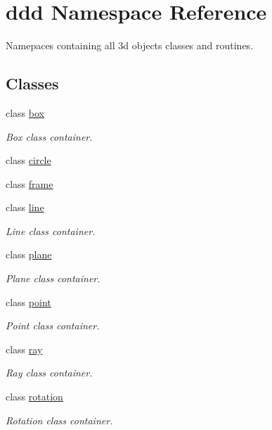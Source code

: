 \hypertarget{namespaceddd}{}\section{ddd Namespace Reference}
\label{namespaceddd}


Namepaces containing all 3d objects classes and routines.  


\subsection*{Classes}
\begin{DoxyCompactItemize}
\item 
class \hyperlink{classddd_1_1box}{box}
\begin{DoxyCompactList}\small\item\em Box class container. \end{DoxyCompactList}\item 
class \hyperlink{classddd_1_1circle}{circle}
\item 
class \hyperlink{classddd_1_1frame}{frame}
\item 
class \hyperlink{classddd_1_1line}{line}
\begin{DoxyCompactList}\small\item\em Line class container. \end{DoxyCompactList}\item 
class \hyperlink{classddd_1_1plane}{plane}
\begin{DoxyCompactList}\small\item\em Plane class container. \end{DoxyCompactList}\item 
class \hyperlink{classddd_1_1point}{point}
\begin{DoxyCompactList}\small\item\em Point class container. \end{DoxyCompactList}\item 
class \hyperlink{classddd_1_1ray}{ray}
\begin{DoxyCompactList}\small\item\em Ray class container. \end{DoxyCompactList}\item 
class \hyperlink{classddd_1_1rotation}{rotation}
\begin{DoxyCompactList}\small\item\em Rotation class container. \end{DoxyCompactList}\item 

\end{DoxyCompactItemize}
